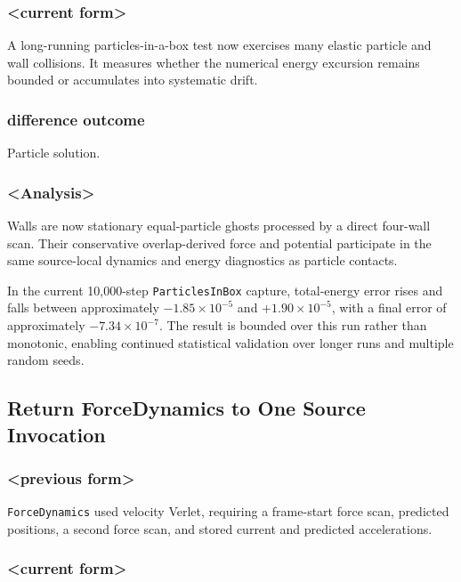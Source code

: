 \subsubsection{<current form>}

A long-running particles-in-a-box test now exercises many elastic particle and
wall collisions.  It measures whether the numerical energy excursion remains
bounded or accumulates into systematic drift.

\subsubsection{difference outcome}

Particle solution.

\subsubsection{<Analysis>}

Walls are now stationary equal-particle ghosts processed by a direct
four-wall scan.  Their conservative overlap-derived force and potential
participate in the same source-local dynamics and energy diagnostics as
particle contacts.

In the current 10,000-step \texttt{ParticlesInBox} capture, total-energy error
rises and falls between approximately \(-1.85\times10^{-5}\) and
\(+1.90\times10^{-5}\), with a final error of approximately
\(-7.34\times10^{-7}\).  The result is bounded over this run rather than
monotonic, enabling continued statistical validation over longer runs and
multiple random seeds.

\subsection{Return ForceDynamics to One Source Invocation}

\subsubsection{<previous form>}

\texttt{ForceDynamics} used velocity Verlet, requiring a frame-start force
scan, predicted positions, a second force scan, and stored current and
predicted accelerations.

\subsubsection{<current form>}

